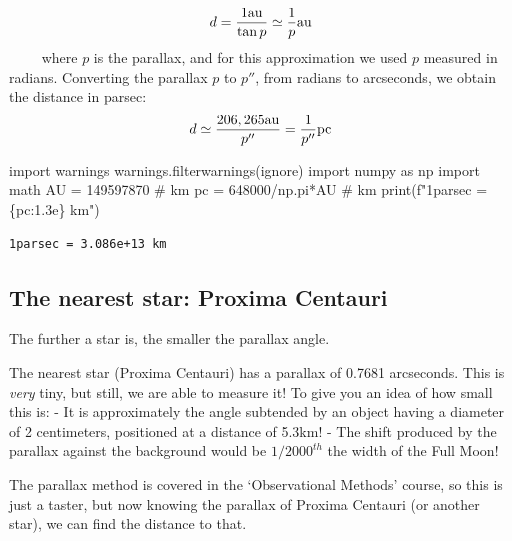 \documentclass[
  letterpaper,
  DIV=11,
  numbers=noendperiod]{scrreprt}
\newenvironment{Shaded}{\begin{snugshade}}{\end{snugshade}}
\newcommand{\BuiltInTok}[1]{\textcolor[rgb]{0.00,0.23,0.31}{#1}}
\newcommand{\CommentTok}[1]{\textcolor[rgb]{0.37,0.37,0.37}{#1}}
\newcommand{\DecValTok}[1]{\textcolor[rgb]{0.68,0.00,0.00}{#1}}
\newcommand{\ImportTok}[1]{\textcolor[rgb]{0.00,0.46,0.62}{#1}}
\newcommand{\NormalTok}[1]{\textcolor[rgb]{0.00,0.23,0.31}{#1}}
\newcommand{\OperatorTok}[1]{\textcolor[rgb]{0.37,0.37,0.37}{#1}}
\newcommand{\SpecialCharTok}[1]{\textcolor[rgb]{0.37,0.37,0.37}{#1}}
\newcommand{\SpecialStringTok}[1]{\textcolor[rgb]{0.13,0.47,0.30}{#1}}
\newcommand{\StringTok}[1]{\textcolor[rgb]{0.13,0.47,0.30}{#1}}
\begin{document}
\[
    d =\dfrac{1 \rm{au}}{\tan p}\simeq \dfrac{1}{p} \rm{au} 
\] \(\qquad\) where \(p\) is the parallax, and for this approximation we
used \(p\) measured in radians. Converting the parallax \(p\) to
\(p''\), from radians to arcseconds, we obtain the distance in parsec:
\[
    d \simeq\dfrac{206,265 \rm{au}}{p''}= \dfrac{1}{p''} \rm{pc} 
\]

\begin{Shaded}
\begin{Highlighting}[]
\ImportTok{import}\NormalTok{ warnings}
\NormalTok{warnings.filterwarnings(}\StringTok{\textquotesingle{}ignore\textquotesingle{}}\NormalTok{)}
\ImportTok{import}\NormalTok{ numpy }\ImportTok{as}\NormalTok{ np}
\ImportTok{import}\NormalTok{ math}
\NormalTok{AU }\OperatorTok{=} \DecValTok{149597870} \CommentTok{\# km}
\NormalTok{pc }\OperatorTok{=} \DecValTok{648000}\OperatorTok{/}\NormalTok{np.pi}\OperatorTok{*}\NormalTok{AU }\CommentTok{\# km}
\BuiltInTok{print}\NormalTok{(}\SpecialStringTok{f"1parsec = }\SpecialCharTok{\{}\NormalTok{pc}\SpecialCharTok{:1.3e\}}\SpecialStringTok{ km"}\NormalTok{)}
\end{Highlighting}
\end{Shaded}

\begin{verbatim}
1parsec = 3.086e+13 km
\end{verbatim}

\hypertarget{the-nearest-star-proxima-centauri}{%
\subsection{The nearest star: Proxima
Centauri}\label{the-nearest-star-proxima-centauri}}

The further a star is, the smaller the parallax angle.

The nearest star (Proxima Centauri) has a parallax of 0.7681 arcseconds.
This is \emph{very} tiny, but still, we are able to measure it! To give
you an idea of how small this is: - It is approximately the angle
subtended by an object having a diameter of 2 centimeters, positioned at
a distance of 5.3km! - The shift produced by the parallax against the
background would be \(1/2000^{th}\) the width of the Full Moon!

The parallax method is covered in the `Observational Methods' course, so
this is just a taster, but now knowing the parallax of Proxima Centauri
(or another star), we can find the distance to that.
\end{document}
